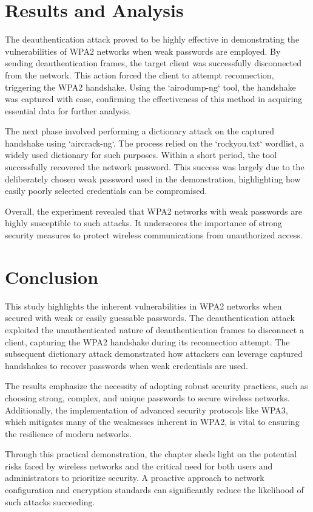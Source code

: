 \section{Results and Analysis}
The deauthentication attack proved to be highly effective in demonstrating the vulnerabilities of WPA2 networks when weak passwords are employed. By sending deauthentication frames, the target client was successfully disconnected from the network. This action forced the client to attempt reconnection, triggering the WPA2 handshake. Using the `airodump-ng` tool, the handshake was captured with ease, confirming the effectiveness of this method in acquiring essential data for further analysis.

The next phase involved performing a dictionary attack on the captured handshake using `aircrack-ng`. The process relied on the `rockyou.txt` wordlist, a widely used dictionary for such purposes. Within a short period, the tool successfully recovered the network password. This success was largely due to the deliberately chosen weak password used in the demonstration, highlighting how easily poorly selected credentials can be compromised.

Overall, the experiment revealed that WPA2 networks with weak passwords are highly susceptible to such attacks. It underscores the importance of strong security measures to protect wireless communications from unauthorized access.

\section{Conclusion}
This study highlights the inherent vulnerabilities in WPA2 networks when secured with weak or easily guessable passwords. The deauthentication attack exploited the unauthenticated nature of deauthentication frames to disconnect a client, capturing the WPA2 handshake during its reconnection attempt. The subsequent dictionary attack demonstrated how attackers can leverage captured handshakes to recover passwords when weak credentials are used.

The results emphasize the necessity of adopting robust security practices, such as choosing strong, complex, and unique passwords to secure wireless networks. Additionally, the implementation of advanced security protocols like WPA3, which mitigates many of the weaknesses inherent in WPA2, is vital to ensuring the resilience of modern networks.

Through this practical demonstration, the chapter sheds light on the potential risks faced by wireless networks and the critical need for both users and administrators to prioritize security. A proactive approach to network configuration and encryption standards can significantly reduce the likelihood of such attacks succeeding.

